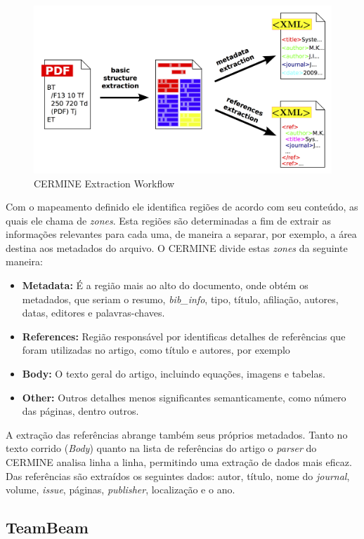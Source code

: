 \documentclass[
	12pt,               %
	openright,          %
	twoside,            %
	a4paper,            %
	english,            %
	brazil              %
	]{abntex2}
\begin{document}
\begin{figure}
\centering
\caption{CERMINE Extraction Workflow}
\label{fig:cermine-workflow}
\includegraphics[width=0.7\linewidth]{./assets/cermine}
\end{figure}

Com o mapeamento definido ele identifica regiões de acordo com seu conteúdo, as quais ele chama de \textit{zones}. Esta regiões são determinadas a fim de extrair as informações relevantes para cada uma, de maneira a separar, por exemplo, a área destina aos metadados do arquivo. O CERMINE divide estas \textit{zones} da seguinte maneira:

\begin{itemize}
\item \textbf{Metadata:} É a região mais ao alto do documento, onde obtém os metadados, que seriam o resumo, \textit{bib\_info}, tipo, título, afiliação, autores, datas, editores e palavras-chaves.
\item \textbf{References:} Região responsável por identificas detalhes de referências que foram utilizadas no artigo, como título e autores, por exemplo
\item \textbf{Body:} O texto geral do artigo, incluindo equações, imagens e tabelas.
\item \textbf{Other:} Outros detalhes menos significantes semanticamente, como número das páginas, dentro outros.
\end{itemize}

A extração das referências abrange também seus próprios metadados. Tanto no texto corrido (\textit{Body}) quanto na lista de referências do artigo o \textit{parser} do CERMINE analisa linha a linha, permitindo uma extração de dados mais eficaz. Das referências são extraídos os seguintes dados: autor, título, nome do \textit{journal}, volume, \textit{issue}, páginas, \textit{publisher}, localização e o ano.

\subsection{TeamBeam}
\end{document}
